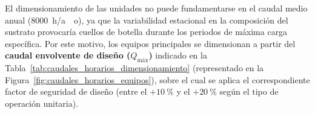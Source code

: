 \documentclass{report}
\begin{document}
El dimensionamiento de las unidades no puede fundamentarse en el caudal medio anual (\SI{8000}{\hour/ao}), ya que la variabilidad estacional en la composición del sustrato provocaría cuellos de botella durante los periodos de máxima carga específica. Por este motivo, los equipos principales se dimensionan a partir del \textbf{caudal envolvente de diseño ($Q_{\text{máx}}$)} indicado en la Tabla~\ref{tab:caudales_horarios_dimensionamiento} (representado en la Figura~\ref{fig:caudales_horarios_equipos}), sobre el cual se aplica el correspondiente factor de seguridad de diseño (entre el $+\SI{10}{\percent}$ y el $+\SI{20}{\percent}$ según el tipo de operación unitaria).

\begin{table}[H]
    \centering
    \caption{Caudales horarios nominales por campaña estacional (alimentación fija de \SI{15000}{\kilo\gram{}/\hour}) y caudal envolvente máximo ($Q_{\text{máx}}$) para el dimensionamiento de equipos. Fuente: Elaboración propia a partir de rendimientos de \textcite{Jafari-Gohargan2026}.}
\end{table}
\end{document}
